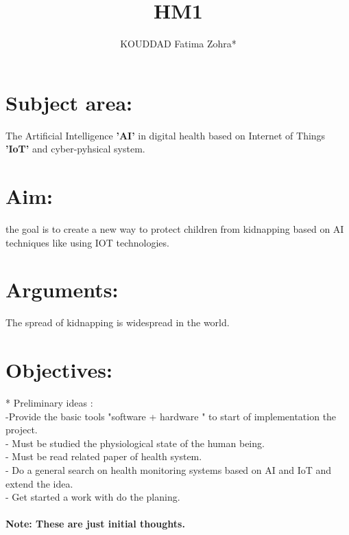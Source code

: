 \documentclass[11pt]{article}
\begin{document}
\title{HM1} 
\author{KOUDDAD Fatima Zohra* } 
\maketitle

\section{Subject area:}
The Artificial Intelligence \textbf{'AI'} in digital health based on Internet of Things \textbf{'IoT'}  and cyber-pyhsical system. \\
\section{Aim:}

 the goal is to create a new way to protect children from kidnapping based on AI techniques like using IOT technologies. \\
\section{Arguments:} 
The spread of kidnapping is widespread in the world.
 \\
\section{Objectives:} 
* Preliminary ideas : \\
    -Provide the basic tools "software + hardware " to start of  implementation the project. \\
    - Must be studied the physiological state of the human being. \\
    - Must be read related paper of health system. \\
    - Do a general search on health monitoring systems based on AI and IoT and extend the idea.  \\
    - Get started a work with do the  planing. \\
    \\
\bf Note: These are just initial thoughts.
\end{document}
